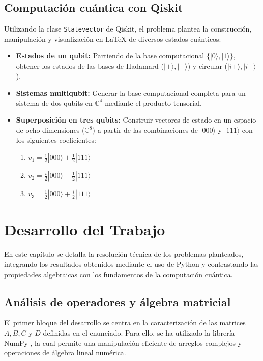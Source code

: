 \documentclass[11pt,a4paper,spanish]{book}
\begin{document}
\section{Computación cuántica con Qiskit}
Utilizando la clase \texttt{Statevector} de Qiskit, el problema plantea la construcción, manipulación y visualización en LaTeX de diversos estados cuánticos:
\begin{itemize}
    \item \textbf{Estados de un qubit:} Partiendo de la base computacional $\{|0\rangle, |1\rangle\}$, obtener los estados de las bases de Hadamard ($|+\rangle, |-\rangle$) y circular ($|i+\rangle, |i-\rangle$).
    \item \textbf{Sistemas multiqubit:} Generar la base computacional completa para un sistema de dos qubits en $\mathbb{C}^4$ mediante el producto tensorial.
    \item \textbf{Superposición en tres qubits:} Construir vectores de estado en un espacio de ocho dimensiones ($\mathbb{C}^8$) a partir de las combinaciones de $|000\rangle$ y $|111\rangle$ con los siguientes coeficientes:
    \begin{enumerate}
        \item $v_1 = \frac{1}{2}|000\rangle + \frac{1}{2}|111\rangle$
        \item $v_2 = \frac{i}{2}|000\rangle - \frac{1}{2}|111\rangle$
        \item $v_3 = \frac{1}{2}|000\rangle + \frac{i}{2}|111\rangle$
    \end{enumerate}
\end{itemize}

\chapter{Desarrollo del Trabajo}

En este capítulo se detalla la resolución técnica de los problemas planteados, integrando los resultados obtenidos mediante el uso de Python y contrastando las propiedades algebraicas con los fundamentos de la computación cuántica.

\section{Análisis de operadores y álgebra matricial}
El primer bloque del desarrollo se centra en la caracterización de las matrices $A, B, C$ y $D$ definidas en el enunciado. Para ello, se ha utilizado la librería NumPy \citep{harris2020}, la cual permite una manipulación eficiente de arreglos complejos y operaciones de álgebra lineal numérica.
\end{document}
